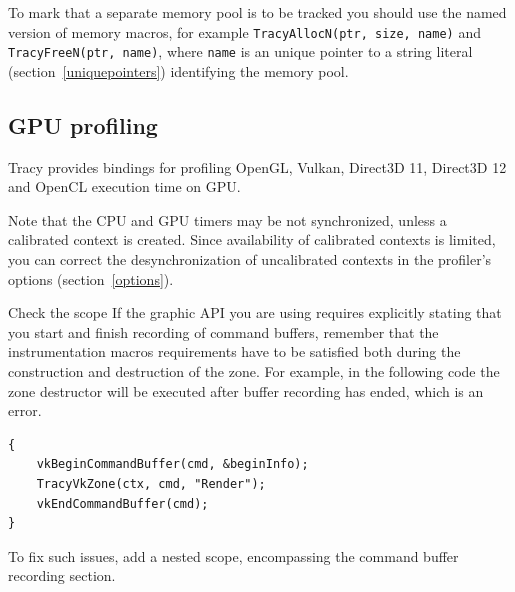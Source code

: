 \documentclass[hidelinks,titlepage,a4paper]{article}
\begin{document}
To mark that a separate memory pool is to be tracked you should use the named version of memory macros, for example \texttt{TracyAllocN(ptr, size, name)} and \texttt{TracyFreeN(ptr, name)}, where \texttt{name} is an unique pointer to a string literal (section~\ref{uniquepointers}) identifying the memory pool.

\subsection{GPU profiling}
\label{gpuprofiling}

Tracy provides bindings for profiling OpenGL, Vulkan, Direct3D 11, Direct3D 12 and OpenCL execution time on GPU.

Note that the CPU and GPU timers may be not synchronized, unless a calibrated context is created. Since availability of calibrated contexts is limited, you can correct the desynchronization of uncalibrated contexts in the profiler's options (section~\ref{options}).

\begin{bclogo}[
noborder=true,
couleur=black!5,
logo=\bclampe
]{Check the scope}
If the graphic API you are using requires explicitly stating that you start and finish recording of command buffers, remember that the instrumentation macros requirements have to be satisfied both during the construction and destruction of the zone. For example, in the following code the zone destructor will be executed after buffer recording has ended, which is an error.

\begin{lstlisting}
{
    vkBeginCommandBuffer(cmd, &beginInfo);
    TracyVkZone(ctx, cmd, "Render");
    vkEndCommandBuffer(cmd);
}
\end{lstlisting}

To fix such issues, add a nested scope, encompassing the command buffer recording section.
\end{bclogo}
\end{document}
